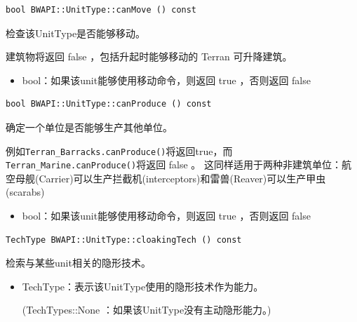 \begin{tcolorbox}[colback=white, colframe=black!60!white, title=canMove(), arc=0mm]
    \begin{verbatim}
bool BWAPI::UnitType::canMove () const
    \end{verbatim}
    检查该UnitType是否能够移动。
\begin{note}
    建筑物将返回   false  ，包括升起时能够移动的 Terran 可升降建筑。
\end{note}
\begin{return}
\begin{itemize}
    \item bool：如果该unit能够使用移动命令，则返回   true  ，否则返回   false
\end{itemize}
\end{return}
\end{tcolorbox}


\begin{tcolorbox}[colback=white, colframe=black!60!white, title=canProduce(), arc=0mm]
    \begin{verbatim}
bool BWAPI::UnitType::canProduce () const
    \end{verbatim}
    确定一个单位是否能够生产其他单位。\par
    例如\verb|Terran_Barracks.canProduce()|将返回true，而\verb|Terran_Marine.canProduce()|将返回   false  。
    这同样适用于两种非建筑单位：航空母舰(Carrier)可以生产拦截机(interceptors)和雷兽(Reaver)可以生产甲虫(scarabs)
\begin{return}
\begin{itemize}
    \item bool：如果该unit能够使用移动命令，则返回   true  ，否则返回   false
\end{itemize}
\end{return}
\end{tcolorbox}


\begin{tcolorbox}[colback=white, colframe=black!60!white, title=cloakingTech(), arc=0mm]
    \begin{verbatim}
TechType BWAPI::UnitType::cloakingTech () const
    \end{verbatim}
    检索与某些unit相关的隐形技术。
\begin{return}
\begin{itemize}
    \item TechType：表示该UnitType使用的隐形技术作为能力。\par
    (TechTypes::None  ：如果该UnitType没有主动隐形能力。)
\end{itemize}
\end{return}
\end{tcolorbox}


